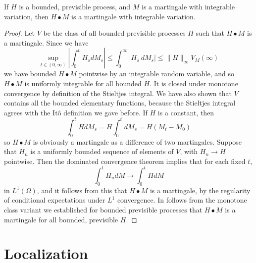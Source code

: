 \begin{theorem}
    If $H$ is a bounded, previsible process, and $M$ is a martingale with integrable variation, then $H \bullet M$ is a martingale with integrable variation.
\end{theorem}
\begin{proof}
    Let $V$ be the class of all bounded previsible processes $H$ such that $H \bullet M$ is a martingale. Since we have
    \[ \sup_{t \in (0,\infty)} \left| \int_0^t H_s dM_s \right| \leq \int_0^\infty |H_s\ dM_s| \leq \| H \|_\infty V_M(\infty) \]
    we have bounded $H \bullet M$ pointwise by an integrable random variable, and so $H \bullet M$ is uniformly integrable for all bounded $H$. It is closed under monotone convergence by definition of the Stieltjes integral. We have also shown that $V$ contains all the bounded elementary functions, because the Stieltjes integral agrees with the It\^{o} definition we gave before. If $H$ is a constant, then
    \[ \int_0^t H dM_s = H \int_0^t dM_s = H(M_t - M_0) \]
    so $H \bullet M$ is obviously a martingale as a difference of two martingales. Suppose that $H_n$ is a uniformly bounded sequence of elements of $V$, with $H_n \to H$ pointwise. Then the dominated convergence theorem implies that for each fixed $t$,
    \[ \int_0^t H_n dM \to \int_0^t H dM \]
    in $L^1(\Omega)$, and it follows from this that $H \bullet M$ is a martingale, by the regularity of conditional expectations under $L^1$ convergence. In follows from the monotone class variant we established for bounded previsible processes that $H \bullet M$ is a martingale for all bounded, previsible $H$.
\end{proof}

\section{Localization}

